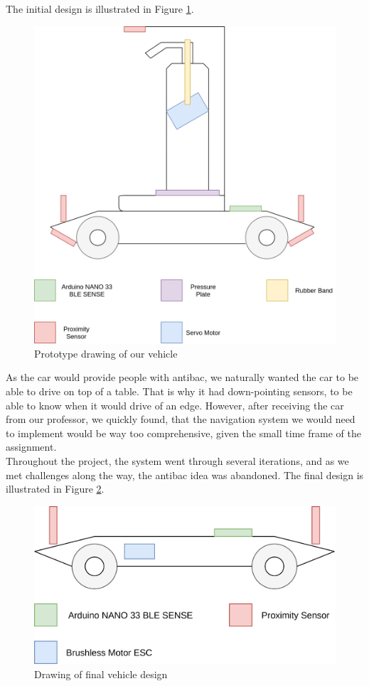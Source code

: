 \documentclass{article}
\begin{document}
The initial design is illustrated in Figure \ref{ProtoDrawing}.

\begin{figure}[H]
	\centering
	\includegraphics[width=\linewidth]{prototype-drawing.png}
	\caption{Prototype drawing of our vehicle}
	\label{ProtoDrawing}
\end{figure}

As the car would provide people with antibac, we naturally wanted the car to be able to drive on top of a table. That is why it had down-pointing sensors, to be able to know when it would drive of an edge. However, after receiving the car from our professor, we quickly found, that the navigation system we would need to implement would be way too comprehensive, given the small time frame of the assignment.\\

Throughout the project, the system went through several iterations, and as we met challenges along the way, the antibac idea was abandoned. The final design is illustrated in Figure \ref{final-design}.

\begin{figure}[H]
	\centering
	\includegraphics[width=\linewidth]{final-design.png}
    \caption{Drawing of final vehicle design}
	\label{final-design}
\end{figure}
\end{document}

